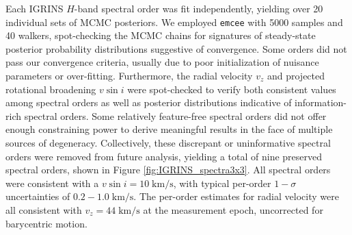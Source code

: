 \documentclass[trackchanges]{aastex631}
\begin{document}
Each IGRINS $H$-band spectral order was fit independently, yielding over 20 individual sets of MCMC posteriors.  We employed \texttt{emcee} \citep{foreman13} with 5000 samples and 40 walkers, spot-checking the MCMC chains for signatures of steady-state posterior probability distributions suggestive of convergence.  Some orders did not pass our convergence criteria, usually due to poor initialization of nuisance parameters or over-fitting.  Furthermore, the radial velocity $v_z$ and projected rotational broadening $v\sin{i}$ were spot-checked to verify both consistent values among spectral orders as well as posterior distributions indicative of information-rich spectral orders.  Some relatively feature-free spectral orders did not offer enough constraining power to derive meaningful results in the face of multiple sources of degeneracy.  Collectively, these discrepant or uninformative spectral orders were removed from future analysis, yielding a total of nine preserved spectral orders, shown in Figure \ref{fig:IGRINS_spectra3x3}. All spectral orders were consistent with a $v\sin{i}=10 \;\mathrm{km/s}$, with typical per-order $1-\sigma$ uncertainties of $0.2-1.0 \;\mathrm{km/s}$.  The per-order estimates for radial velocity were all consistent with $v_z=44\;\mathrm{km/s}$ at the measurement epoch, uncorrected for barycentric motion.
\end{document}
